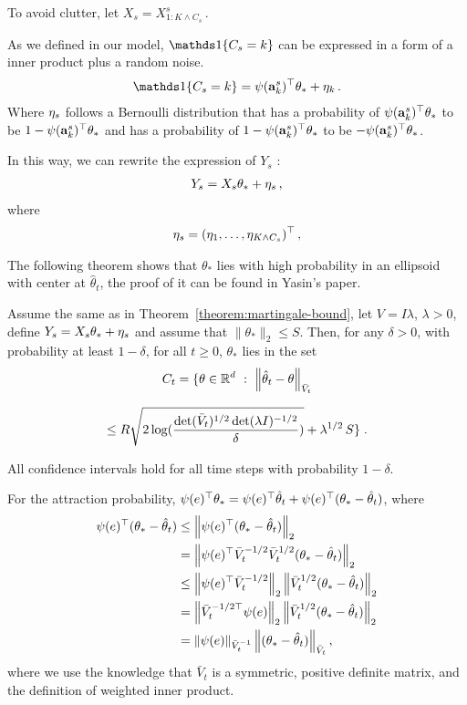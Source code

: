 To avoid clutter, let $X_s = X^s_{1 : K \wedge C_s}\,.$

As we defined in our model, $\I{C_s=k}$ can be expressed in a form of a inner product plus a random noise.
\begin{align*}
  \I{C_s=k} = \psi(\rnd{a}^s_k)^\top \theta_* + \rnd{\eta}_k \,.
\end{align*}
Where $ \mathbf{\eta}_s $ follows a Bernoulli distribution that
has a probability of $\psi(\mathbf{a}^s_k)^\top \theta_*$ to be $1 - \psi(\mathbf{a}^s_k)^\top \theta_*$
and has a probability of $1 - \psi(\mathbf{a}^s_k)^\top \theta_*$ to be $-\psi(\mathbf{a}^s_k)^\top \theta_*$.

In this way, we can rewrite the expression of $Y_s$ :
\begin{align*}
  Y_s = X_s \theta_* + \mathbf{\eta}_s \,,
\end{align*}
where
\begin{align*}
  \mathbf{\eta}_s = (\mathbf{\eta}_1, \dots, \mathbf{\eta}_{K \wedge C_s})^\top \,,
\end{align*}

The following theorem shows that $\theta_*$ lies with high probability in an
ellipsoid with center at $\hat{\theta}_t$, the proof of it can be found in Yasin's paper.

\begin{theorem}
\label{theorem:confidence-ellipsoid}
Assume the same as in Theorem~\ref{theorem:martingale-bound}, let $V = I \lambda$, $\lambda > 0$, define
$Y_s = X_s \theta_* + \mathbf{\eta}_s$ and assume that $\|\theta_*\|_2 \le S$. Then, for any $\delta > 0$, with probability at least $1-\delta$,
for all $t \ge 0$, $\theta_*$ lies in the set
$$
C_t = \{ \theta \in \mathbb{R}^d ~:~ \left\|\hat{\theta}_t -  \theta\right\|_{\bar{V}_{t}}
$$

$$
\le R \sqrt{2 \log( \frac{\det (\bar{V}_{t})^{1/2}\det(\lambda I)^{-1/2}}{\delta} )} + \lambda^{1/2}\, S \} \; .
$$

All confidence intervals hold for all time steps with probability $1-\delta$.

\end{theorem}

For the attraction probability, $\psi(e)^\top \mathbf{\theta}_* = \psi(e)^\top \hat{\mathbf{\theta}}_t + \psi(e)^\top (\mathbf{\theta}_* - \hat{\mathbf{\theta}}_t)$, where
\begin{align*}
\psi(e)^\top (\mathbf{\theta}_* - \hat{\mathbf{\theta}}_t)
&\le \left\|\psi(e)^\top (\mathbf{\theta}_* - \hat{\mathbf{\theta}}_t)\right\|_2  \\
&= \left\|\psi(e)^\top {\bar{V}_{t}}^{-1/2} {\bar{V}_{t}}^{1/2} (\mathbf{\theta}_* - \hat{\mathbf{\theta}}_t)\right\|_2 \\
&\le \left\|\psi(e)^\top {\bar{V}_{t}}^{-1/2}\right\|_2 \left\|{\bar{V}_{t}}^{1/2} (\mathbf{\theta}_* - \hat{\mathbf{\theta}}_t)\right\|_2 \\
&= \left\|{{\bar{V}_{t}}^{-1/2 \top}} \psi(e)\right\|_2 \left\|{\bar{V}_{t}}^{1/2} (\mathbf{\theta}_* - \hat{\mathbf{\theta}}_t)\right\|_2 \\
&= \left\| \psi(e)\right\|_{\bar{V}_{t}^{-1}} \left\|(\mathbf{\theta}_* - \hat{\mathbf{\theta}}_t)\right\|_{\bar{V}_{t}} ,
\end{align*}
where we use the knowledge that $\bar{V}_{t}$ is a symmetric, positive definite matrix, and the definition of weighted inner product. 

